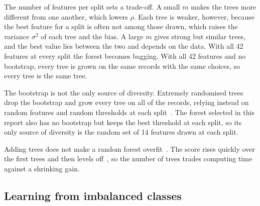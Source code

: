 \documentclass[conference,10pt]{IEEEtran}
\begin{document}
The number of features per split sets a trade-off. A small $m$ makes the
trees more different from one another, which lowers $\rho$. Each tree is
weaker, however, because the best feature for a split is often not among
those drawn, which raises the variance $\sigma^2$ of each tree and the bias.
A large $m$ gives strong but similar trees, and the best value lies between
the two and depends on the data. With all 42 features at every split the
forest becomes bagging. With all 42 features and no bootstrap, every tree is
grown on the same records with the same choices, so every tree is the same
tree.

The bootstrap is not the only source of diversity. Extremely randomised
trees drop the bootstrap and grow every tree on all of the records, relying
instead on random features and random thresholds at each
split~\cite{geurts2006extremely}. The forest selected in this report also has no bootstrap but keeps the best threshold
at each split, so its only source of diversity is the random set of 14
features drawn at each split.

Adding trees does not make a random forest overfit~\cite{breiman2001random}.
The score rises quickly over the first trees and then levels
off~\cite{probst2018tune}, so the number of trees trades computing time
against a shrinking gain.

\subsection{Learning from imbalanced classes}
\label{subsec:bg_imbalance}
%
\end{document}
